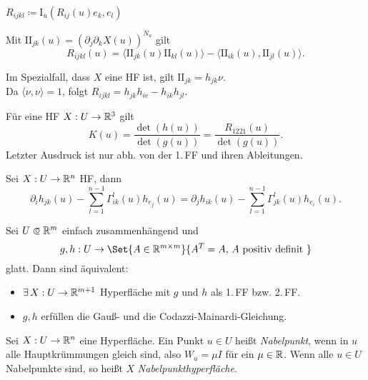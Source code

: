 \documentclass{cheat-sheet}
\newcommand{\I}{\mathrm{I}}
\newcommand{\II}{\mathrm{I\!I}}
\begin{document}
\begin{nota}
  $R_{ijkl} \coloneqq \I_u(R_{ij}(u) e_k, e_l)$
\end{nota}

\begin{satz}[Gaußgleichung]
  Mit $\II_{jk}(u) = \left( \partial_j \partial_k X(u) \right)^{N_u}$ gilt
  \[ R_{ijkl}(u) = \langle \II_{jk} (u) \II_{kl}(u) \rangle - \langle \II_{ik}(u), \II_{jl}(u) \rangle. \]
\end{satz}

\begin{bem}
  Im Spezialfall, dass $X$ eine HF ist, gilt $\II_{jk} = h_{jk} \nu$.\\
  Da $\langle \nu, \nu \rangle = 1$, folgt $R_{ijkl} = h_{jk} h_{ie} - h_{ik} h_{jl}$.
\end{bem}

\begin{satz}
  Für eine HF $X : U \to \mathbb{R}^3$ gilt
  \[ K(u) = \frac{\det(h(u))}{\det(g(u))} = \frac{R_{1221}(u)}{\det(g(u))}. \]
  Letzter Ausdruck ist nur abh. von der 1.\,FF und ihren Ableitungen.
\end{satz}

\begin{satz}
  Sei $X : U \to \mathbb{R}^n$ HF, dann
  \[ \partial_i h_{jk}(u) - \sum_{l=1}^{n-1} \Gamma_{ik}^l(u) h_{e_j}(u) = \partial_j h_{ik}(u) - \sum_{l=1}^{n-1} \Gamma_{jk}^l(u) h_{e_i}(u). \]
\end{satz}

\begin{satz}
  Sei $U \opn \R^m$ einfach zusammenhängend und
  \[ g, h : U \to \Set{ A \in \R^{m \times m} }{ A^T = A, \, A \text{ positiv definit } } \]
  glatt. Dann sind äquivalent:
  \begin{itemize}
    \item $\exists \, X : U \to \mathbb{R}^{m+1}$ Hyperfläche mit $g$ und $h$ als 1.\,FF bzw. 2.\,FF.
    \item $g, h$ erfüllen die Gauß- und die Codazzi-Mainardi-Gleichung.
  \end{itemize}
\end{satz}



\begin{definition}
  Sei $X : U \to \mathbb{R}^n$ eine Hyperfläche. Ein Punkt $u \in U$ heißt \emph{Nabelpunkt}, wenn in $u$ alle Hauptkrümmungen gleich sind, also $W_u = \mu I$ für ein $\mu \in \mathbb{R}$. Wenn alle $u \in U$ Nabelpunkte sind, so heißt $X$ \emph{Nabelpunkthyperfläche}.
\end{definition}
\end{document}
